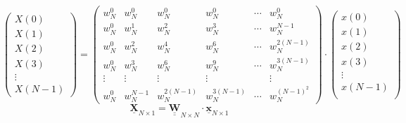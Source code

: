 \documentclass[10pt,a4paper]{article}
\begin{document}
{\footnotesize
\[
	\begin{pmatrix}
		X(0)\\
		X(1)\\
		X(2)\\
		X(3)\\
		\vdots\\
		X(N-1)
	\end{pmatrix} = \begin{pmatrix}
		w_{N}^0&w_{N}^0&w_{N}^0&w_{N}^0&\cdots&w_{N}^0\\
		w_{N}^0&w_{N}^1&w_{N}^2&w_{N}^3&\cdots&w_{N}^{N-1}\\
		w_{N}^0&w_{N}^2&w_{N}^4&w_{N}^6&\cdots&w_{N}^{2(N-1)}\\
		w_{N}^0&w_{N}^3&w_{N}^6&w_{N}^9&\cdots&w_{N}^{3(N-1)}\\
		\vdots&\vdots&\vdots&\vdots&&\vdots\\
		w_{N}^0&w_{N}^{N-1}&w_{N}^{2(N-1)}&w_{N}^{3(N-1)}&\cdots&w_{N}^{(N-1)^2}
	\end{pmatrix} \cdot \begin{pmatrix}
		x(0)\\
		x(1)\\
		x(2)\\
		x(3)\\
		\vdots\\
		x(N-1)\\
		\end{pmatrix}
\]}
\[
	\underline{\textbf{X}}_{N \times 1} = \underline{\underline{\textbf{W}}}_{N \times N} \cdot  \underline{\textbf{x}}_{N \times 1}
\]
\end{document}
